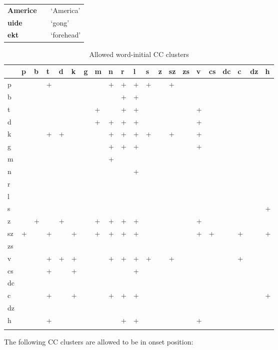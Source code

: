 \begin{center} \small
	\begin{tabularx}{0.8\textwidth}{>{\bfseries}YYY}
		Americe &  &`America'\\
		uide&& `gong'\\
		ekt&&`forehead'\\
	\end{tabularx}
\end{center}

\begin{table}[h!]
	\small \centering
	\caption{Allowed word-initial CC clusters}
	\begin{tabularx}{\textwidth}{YMMMMMMMMMMMMMMMMMMMM}
		\toprule
		&p&b&t&d&k&g&m&n&r&l&s&z&sz&zs&v&cs&dc&c&dz&h\\
		\midrule
		p&&&+&&&&&+&+&+&+&&+&&&&&&&\\
		b&&&&&&&&&+&+&&&&&&&&&&\\
		t&&&&&&&+&&+&+&&&&&+&&&&&\\
		d&&&&&&&+&+&+&+&&&&&+&&&&&\\
		k&&&+&+&&&&+&+&+&+&&+&&+&&&&&\\
		g&&&&&&&&+&+&+&&&&&+&&&&&\\
		m&&&&&&&&+&&&&&&&&&&&&\\
		n&&&&&&&&&&+&&&&&&&&&&\\
		r&&&&&&&&&&&&&&&&&&&&\\
		l&&&&&&&&&&&&&&&&&&&&\\
		s&&&&&&&&&&&&&&&&&&&&+\\
		z&&+&&+&&&+&+&+&+&&&&&+&&&&&\\
		sz&+&&+&&+&&+&+&+&+&&&&&+&+&&+&&+\\
		zs&&&&&&&&&&&&&&&&&&&&\\
		v&&&+&+&+&&&+&+&+&+&&+&&&&&+&&\\
		cs&&&+&&+&&&&&+&&&&&&&&&&\\
		dc&&&&&&&&&&&&&&&&&&&&\\
		c&&&+&&+&&&+&+&+&&&&&&&&&&+\\
		dz&&&&&&&&&&&&&&&&&&&&\\
		h&&&+&&&&&&+&+&&&&&+&&&&&\\
		\bottomrule
		\addlinespace
	\end{tabularx}
\end{table}

\par The following CC clusters are allowed to be in onset position:

